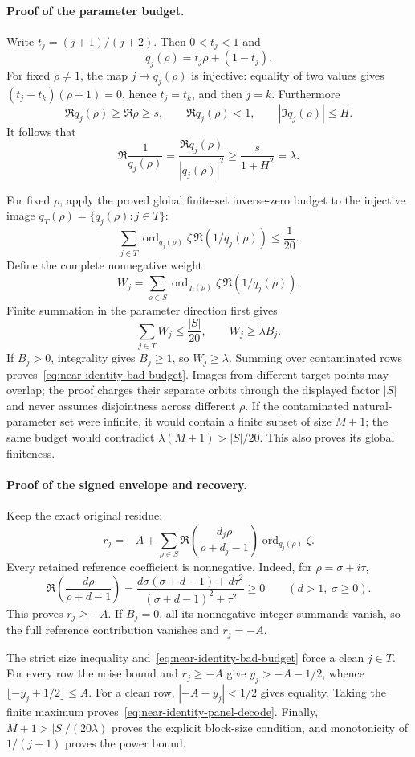 \paragraph{Proof of the parameter budget.}
Write \(t_j=(j+1)/(j+2)\). Then \(0<t_j<1\) and
\[
 q_j(\rho)=t_j\rho+(1-t_j).
\]
For fixed \(\rho\ne1\), the map \(j\mapsto q_j(\rho)\) is injective:
equality of two values gives
\((t_j-t_k)(\rho-1)=0\), hence \(t_j=t_k\), and then \(j=k\).
Furthermore
\[
 \Re q_j(\rho)\ge\Re\rho\ge s,\qquad
 \Re q_j(\rho)<1,\qquad |\Im q_j(\rho)|\le H.
\]
It follows that
\[
 \Re\frac1{q_j(\rho)}
 =\frac{\Re q_j(\rho)}{|q_j(\rho)|^2}
 \ge \frac{s}{1+H^2}=\lambda.
\]

For fixed \(\rho\), apply the proved global finite-set inverse-zero budget
to the injective image \(q_T(\rho)=\{q_j(\rho):j\in T\}\):
\[
 \sum_{j\in T}\operatorname{ord}_{q_j(\rho)}\zeta\,
                  \Re(1/q_j(\rho))\le\frac1{20}.
\]
Define the complete nonnegative weight
\[
 W_j=\sum_{\rho\in S}\operatorname{ord}_{q_j(\rho)}\zeta\,
                         \Re(1/q_j(\rho)).
\]
Finite summation in the parameter direction first gives
\[
 \sum_{j\in T}W_j\le\frac{|S|}{20},\qquad W_j\ge\lambda B_j.
\]
If \(B_j>0\), integrality gives \(B_j\ge1\), so \(W_j\ge\lambda\).
Summing over contaminated rows proves~\eqref{eq:near-identity-bad-budget}.
Images from different target points may overlap; the proof charges their
separate orbits through the displayed factor \(|S|\) and never assumes
disjointness across different \(\rho\).
If the contaminated natural-parameter set were infinite, it would contain
a finite subset of size \(M+1\); the same budget would contradict
\(\lambda(M+1)>|S|/20\). This also proves its global finiteness.

\paragraph{Proof of the signed envelope and recovery.}
Keep the exact original residue:
\[
 r_j=-A+
 \sum_{\rho\in S}
  \Re\!\left(\frac{d_j\rho}{\rho+d_j-1}\right)
                  \operatorname{ord}_{q_j(\rho)}\zeta.
\]
Every retained reference coefficient is nonnegative. Indeed, for
\(\rho=\sigma+i\tau\),
\[
 \Re\!\left(\frac{d\rho}{\rho+d-1}\right)
 =\frac{d\sigma(\sigma+d-1)+d\tau^2}
        {(\sigma+d-1)^2+\tau^2}\ge0
 \qquad(d>1,\ \sigma\ge0).
\]
This proves \(r_j\ge-A\). If \(B_j=0\), all its nonnegative integer
summands vanish, so the full reference contribution vanishes and
\(r_j=-A\).

The strict size inequality and~\eqref{eq:near-identity-bad-budget}
force a clean \(j\in T\). For every row the noise bound and \(r_j\ge-A\)
give \(y_j>-A-1/2\), whence
\(\lfloor-y_j+1/2\rfloor\le A\).
For a clean row, \(|-A-y_j|<1/2\) gives equality.
Taking the finite maximum proves~\eqref{eq:near-identity-panel-decode}.
Finally, \(M+1>|S|/(20\lambda)\) proves the explicit block-size condition,
and monotonicity of \(1/(j+1)\) proves the power bound.

